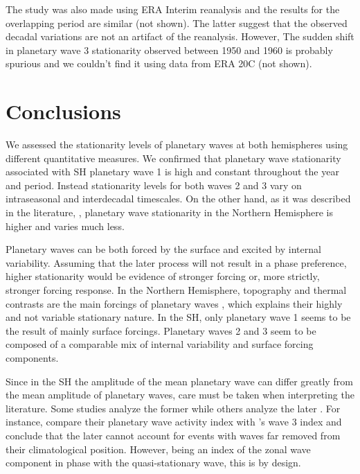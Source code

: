 \documentclass[draft,linenumbers]{agujournal2018}
\begin{document}
The study was also made using ERA Interim reanalysis and the results for
the overlapping period are similar (not shown). The latter suggest that
the observed decadal variations are not an artifact of the reanalysis.
However, The sudden shift in planetary wave 3 stationarity observed
between 1950 and 1960 is probably spurious and we couldn't find it using
data from ERA 20C (not shown).

\section{Conclusions}

We assessed the stationarity levels of planetary waves at both
hemispheres using different quantitative measures. We confirmed that
planetary wave stationarity associated with SH planetary wave 1 is high
and constant throughout the year and period. Instead stationarity levels
for both waves 2 and 3 vary on intraseasonal and interdecadal
timescales. On the other hand, as it was described in the literature, ,
planetary wave stationarity in the Northern Hemisphere is higher and
varies much less.

Planetary waves can be both forced by the surface and excited by
internal variability. Assuming that the later process will not result in
a phase preference, higher stationarity would be evidence of stronger
forcing or, more strictly, stronger forcing response. In the Northern
Hemisphere, topography and thermal contrasts are the main forcings of
planetary waves \citep{chen1988}, which explains their highly and not
variable stationary nature. In the SH, only planetary wave 1 seems to be
the result of mainly surface forcings. Planetary waves 2 and 3 seem to
be composed of a comparable mix of internal variability and surface
forcing components.

Since in the SH the amplitude of the mean planetary wave can differ
greatly from the mean amplitude of planetary waves, care must be taken
when interpreting the literature. Some studies analyze the former
\citep[e.g.~][\citet{quintanar1995a}, \citet{raphael2004}]{vanloon1972}
while others analyze the later \citep[e.g.~][\citet{turner2017},
\citet{irving2015}]{rao2004}. For instance, \citet{irving2015} compare
their planetary wave activity index with \citet{raphael2004}'s wave 3
index and conclude that the later cannot account for events with waves
far removed from their climatological position. However, being an index
of the zonal wave component in phase with the quasi-stationary wave,
this is by design.
\end{document}

